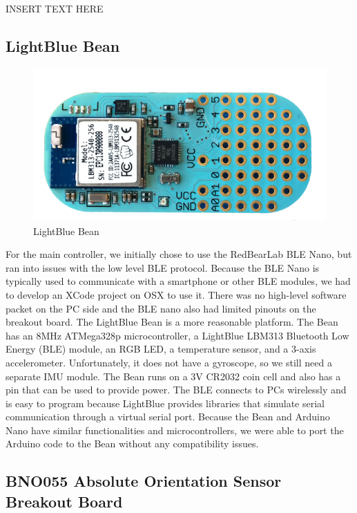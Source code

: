 \documentclass[12pt,journal]{IEEEtran}
\begin{document}
INSERT TEXT HERE

\subsection{LightBlue Bean}

\begin{figure}[H]
  \centering
    \includegraphics[width=0.8\linewidth]{figures/bean}
  \caption{LightBlue Bean}
  \label{fig:bean}
\end{figure}

For the main controller, we initially chose to use the RedBearLab BLE Nano, but ran into issues with the low level BLE protocol. Because the BLE Nano is typically used to communicate with a smartphone or other BLE modules, we had to develop an XCode project on OSX to use it. There was no high-level software packet on the PC side and the BLE nano also had limited pinouts on the breakout board.
The LightBlue Bean is a more reasonable platform. The Bean has an 8MHz ATMega328p microcontroller, a LightBlue LBM313 Bluetooth Low Energy (BLE) module, an RGB LED, a temperature sensor, and a 3-axis accelerometer. Unfortunately, it does not have a gyroscope, so we still need a separate IMU module. The Bean runs on a 3V CR2032 coin cell and also has a pin that can be used to provide power. The BLE connects to PCs wirelessly and is easy to program because LightBlue provides libraries that simulate serial communication through a virtual serial port. Because the Bean and Arduino Nano have similar functionalities and microcontrollers, we were able to port the Arduino code to the Bean without any compatibility issues.

\subsection{BNO055 Absolute Orientation Sensor Breakout Board}
\end{document}
